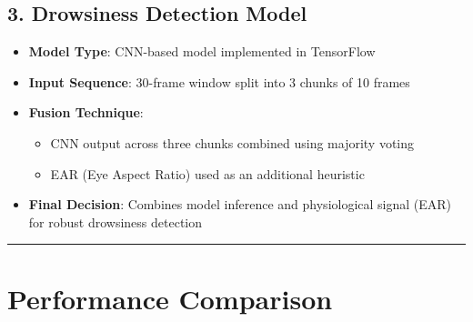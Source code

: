 \documentclass[
  letterpaper,
  DIV=11,
  numbers=noendperiod]{scrreport}
\providecommand{\tightlist}{%
  \setlength{\itemsep}{0pt}\setlength{\parskip}{0pt}}
\begin{document}
\subsection{3. Drowsiness Detection
Model}\label{drowsiness-detection-model}

\begin{itemize}
\tightlist
\item
  \textbf{Model Type}: CNN-based model implemented in TensorFlow\\
\item
  \textbf{Input Sequence}: 30-frame window split into 3 chunks of 10
  frames\\
\item
  \textbf{Fusion Technique}:

  \begin{itemize}
  \tightlist
  \item
    CNN output across three chunks combined using majority voting\\
  \item
    EAR (Eye Aspect Ratio) used as an additional heuristic\\
  \end{itemize}
\item
  \textbf{Final Decision}: Combines model inference and physiological
  signal (EAR) for robust drowsiness detection
\end{itemize}

\begin{center}\rule{0.5\linewidth}{0.5pt}\end{center}

\section{Performance Comparison}\label{performance-comparison}
\end{document}
